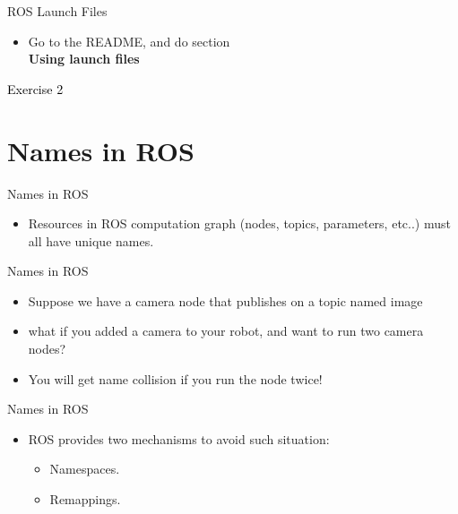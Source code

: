 \documentclass{beamer}
\begin{document}
\begin{frame}{ROS Launch Files}
    \begin{itemize}
        \centering
        \item Go to the README, and do section  \\   \textbf{Using launch files}
    \end{itemize}  
\end{frame}



\begin{frame}[plain]{}  
    \centering
    {\huge \textcolor{black}{Exercise 2}}
\end{frame}


\section{Names in ROS}
\begin{frame}{Names in ROS}
    \begin{itemize}
        \item Resources in ROS computation graph (nodes, topics, parameters, etc..) must all have unique names.

    \end{itemize}  
\end{frame}


\begin{frame}{Names in ROS}
    \begin{itemize}
        \item Suppose we have a {\ttfamily \colorbox{gray!30!white}{camera}} node that publishes on a topic named {\ttfamily \colorbox{gray!30!white}{image}}
        
        \item what if you added a camera to your robot, and want to run two {\ttfamily \colorbox{gray!30!white}{camera}} nodes?
        
        \item You will get name collision if you run the node twice!
    \end{itemize}  
\end{frame}


\begin{frame}{Names in ROS}
    \begin{itemize}
        
        
        \item ROS provides two mechanisms to avoid such situation:
        \begin{itemize}
            \item Namespaces.
            \item Remappings.
        \end{itemize}
    \end{itemize}  
\end{frame}
\end{document}

